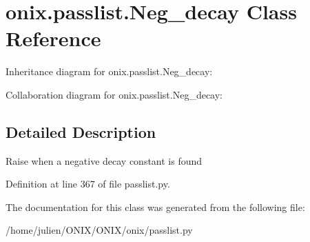 \hypertarget{classonix_1_1passlist_1_1Neg__decay}{}\section{onix.\+passlist.\+Neg\+\_\+decay Class Reference}
\label{classonix_1_1passlist_1_1Neg__decay}


Inheritance diagram for onix.\+passlist.\+Neg\+\_\+decay\+:


Collaboration diagram for onix.\+passlist.\+Neg\+\_\+decay\+:


\subsection{Detailed Description}
\begin{DoxyVerb}Raise when a negative decay constant is found\end{DoxyVerb}
 

Definition at line 367 of file passlist.\+py.



The documentation for this class was generated from the following file\+:\begin{DoxyCompactItemize}
\item 
/home/julien/\+O\+N\+I\+X/\+O\+N\+I\+X/onix/passlist.\+py\end{DoxyCompactItemize}
